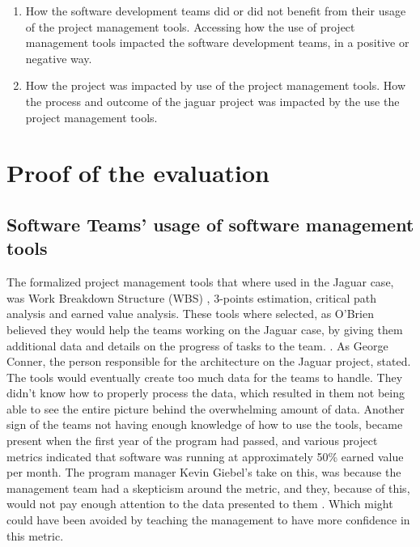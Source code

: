 \begin{enumerate}
    \item How the software development teams did or did not benefit from their usage of the project management tools.
    \subitem Accessing how the use of project management tools impacted the software development teams, in a positive or negative way.

    \item How the project was impacted by use of the project management tools.
    \subitem How the process and outcome of the jaguar project was impacted by the use the project management tools.
\end{enumerate}


\section{Proof of the evaluation}

\subsection{Software Teams' usage of software management tools}

The formalized project management tools that where used in the Jaguar case, was Work Breakdown Structure (WBS) \cite[p. 113]{Larson2021}, 3-points estimation, critical path analysis \cite[ch. 6]{Larson2021} and earned value analysis. These tools where selected, as O'Brien believed they would help the teams working on the Jaguar case, by giving them additional data and details on the progress of tasks to the team. \cite[p. 7]{GinoPisano2005}. 
As George Conner, the person responsible for the architecture on the Jaguar project, stated. The tools would eventually create too much data for the teams to handle. They didn't know how to properly process the data, which resulted in them not being able to see the entire picture behind the overwhelming amount of data.\cite[p. 13]{GinoPisano2005}
Another sign of the teams not having enough knowledge of how to use the tools, became present when the first year of the program had passed, and various project metrics indicated that software was running at approximately 50\% earned value per month. The program manager Kevin Giebel's take on this, was because the management team had a skepticism around the metric, and they, because of this, would not pay enough attention to the data presented to them \cite[p. 9]{GinoPisano2005}. Which might could have been avoided by teaching the management to have more confidence in this metric. 

